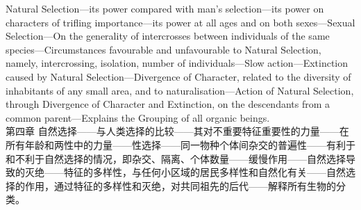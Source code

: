 \documentclass{article}
\begin{document}
\noindent Natural Selection—its power compared with man's selection—its power on characters of trifling importance—its power at all ages and on both sexes—Sexual Selection—On the generality of intercrosses between individuals of the same species—Circumstances favourable and unfavourable to Natural Selection, namely, intercrossing, isolation, number of individuals—Slow action—Extinction caused by Natural Selection—Divergence of Character, related to the diversity of inhabitants of any small area, and to naturalisation—Action of Natural Selection, through Divergence of Character and Extinction, on the descendants from a common parent—Explains the Grouping of all organic beings.\\
第四章 自然选择——与人类选择的比较——其对不重要特征重要性的力量——在所有年龄和两性中的力量——性选择——同一物种个体间杂交的普遍性——有利于和不利于自然选择的情况，即杂交、隔离、个体数量——缓慢作用——自然选择导致的灭绝——特征的多样性，与任何小区域的居民多样性和自然化有关——自然选择的作用，通过特征的多样性和灭绝，对共同祖先的后代——解释所有生物的分类。\\

\addtolength{\leftskip}{-1cm}
\addtolength{\rightskip}{-1cm}
\end{document}
